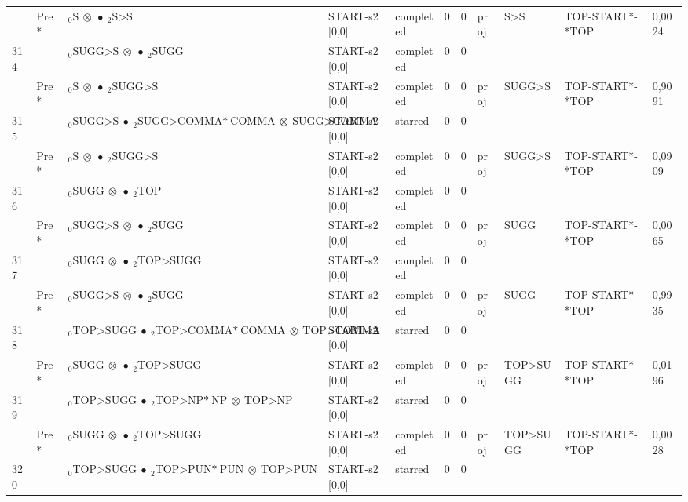 \documentclass[10pt]{article}
\begin{document}
\begin{longtable}[htbp]{lllllllllll}
 & Pre *& $ {}_0 \textrm{S} \  \otimes \  \bullet \ {}_{2} \textrm{S>S} $ & START-s2 [0,0] & completed & 0 & 0 & proj & S>S & TOP-START*-*TOP & 0,0024 \\ 
314 & & $ {}_0 \textrm{SUGG>S} \  \otimes \  \bullet \ {}_{2} \textrm{SUGG} $ & START-s2 [0,0] & completed & 0 & 0 & & & & \\ 
 & Pre *& $ {}_0 \textrm{S} \  \otimes \  \bullet \ {}_{2} \textrm{SUGG>S} $ & START-s2 [0,0] & completed & 0 & 0 & proj & SUGG>S & TOP-START*-*TOP & 0,9091 \\ 
315 & & $ {}_0 \textrm{SUGG>S} \  \bullet \ {}_{2} \textrm{SUGG>COMMA*} \ \textrm{COMMA} \  \otimes \ \textrm{SUGG>COMMA} $ & START-s2 [0,0] & starred & 0 & 0 & & & & \\ 
 & Pre *& $ {}_0 \textrm{S} \  \otimes \  \bullet \ {}_{2} \textrm{SUGG>S} $ & START-s2 [0,0] & completed & 0 & 0 & proj & SUGG>S & TOP-START*-*TOP & 0,0909 \\ 
316 & & $ {}_0 \textrm{SUGG} \  \otimes \  \bullet \ {}_{2} \textrm{TOP} $ & START-s2 [0,0] & completed & 0 & 0 & & & & \\ 
 & Pre *& $ {}_0 \textrm{SUGG>S} \  \otimes \  \bullet \ {}_{2} \textrm{SUGG} $ & START-s2 [0,0] & completed & 0 & 0 & proj & SUGG & TOP-START*-*TOP & 0,0065 \\ 
317 & & $ {}_0 \textrm{SUGG} \  \otimes \  \bullet \ {}_{2} \textrm{TOP>SUGG} $ & START-s2 [0,0] & completed & 0 & 0 & & & & \\ 
 & Pre *& $ {}_0 \textrm{SUGG>S} \  \otimes \  \bullet \ {}_{2} \textrm{SUGG} $ & START-s2 [0,0] & completed & 0 & 0 & proj & SUGG & TOP-START*-*TOP & 0,9935 \\ 
318 & & $ {}_0 \textrm{TOP>SUGG} \  \bullet \ {}_{2} \textrm{TOP>COMMA*} \ \textrm{COMMA} \  \otimes \ \textrm{TOP>COMMA} $ & START-s2 [0,0] & starred & 0 & 0 & & & & \\ 
 & Pre *& $ {}_0 \textrm{SUGG} \  \otimes \  \bullet \ {}_{2} \textrm{TOP>SUGG} $ & START-s2 [0,0] & completed & 0 & 0 & proj & TOP>SUGG & TOP-START*-*TOP & 0,0196 \\ 
319 & & $ {}_0 \textrm{TOP>SUGG} \  \bullet \ {}_{2} \textrm{TOP>NP*} \ \textrm{NP} \  \otimes \ \textrm{TOP>NP} $ & START-s2 [0,0] & starred & 0 & 0 & & & & \\ 
 & Pre *& $ {}_0 \textrm{SUGG} \  \otimes \  \bullet \ {}_{2} \textrm{TOP>SUGG} $ & START-s2 [0,0] & completed & 0 & 0 & proj & TOP>SUGG & TOP-START*-*TOP & 0,0028 \\ 
320 & & $ {}_0 \textrm{TOP>SUGG} \  \bullet \ {}_{2} \textrm{TOP>PUN*} \ \textrm{PUN} \  \otimes \ \textrm{TOP>PUN} $ & START-s2 [0,0] & starred & 0 & 0 & & & & \\ 

\end{longtable}
\end{document}
